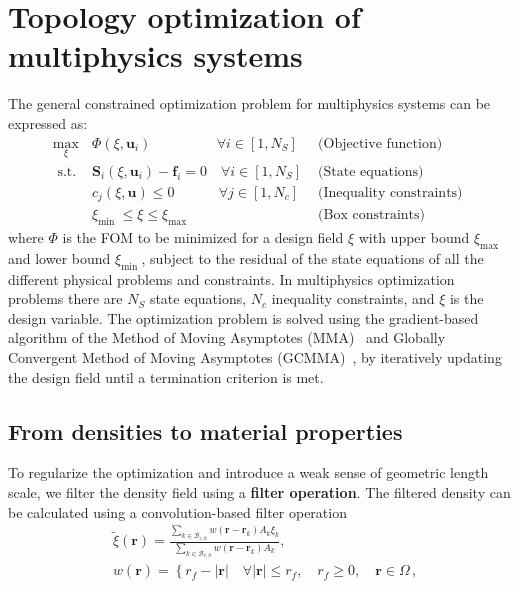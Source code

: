 \section{Topology optimization of multiphysics systems}

The general constrained optimization problem for multiphysics systems can be expressed as:
\begin{equation}
    \begin{array}{clr}
    \max\limits_{\xi} & \Phi(\xi, \mathbf{u}_i) \quad \quad \quad \quad \,\,\,\, \forall i \in\left[1, N_S\right]& \text { (Objective function) } \\
    \text { s.t. } & \mathbf{S}_i(\xi, \mathbf{u}_i)-\mathbf{f}_i=0 \quad \forall i \in\left[1, N_S\right] & \text { (State equations) } \\
    & c_j(\xi, \mathbf{u}) \leq 0 \quad \quad \quad \, \forall j \in\left[1, N_c\right] & \text { (Inequality constraints) } \\
    & \xi_{\text {min }} \leq \xi \leq \xi_{\text {max }} & \text { (Box constraints) }
    \end{array}
\end{equation}
where $\Phi$ is the FOM to be minimized for a design field $\xi$ with upper bound $\xi_{\text {max }}$ and lower bound $\xi_{\text {min }}$,
 subject to the residual of the state equations of all the different physical problems and constraints. In multiphysics optimization problems 
there are $N_S$ state equations, $N_c$ inequality constraints, and $\xi$ is the design variable. The optimization problem is solved using
 the gradient-based algorithm of the Method of Moving
Asymptotes (MMA)~\cite{MMA} and Globally Convergent Method of Moving Asymptotes (GCMMA)~\cite{GCMMA}, by iteratively updating the design field until a termination
criterion is met.

\subsection{From densities to material properties}

To regularize the optimization and introduce a weak sense of geometric length scale, we filter
the density field using a \textbf{filter operation}. The filtered density can be calculated using a 
convolution-based filter operation~\cite{projection}
\begin{equation}
    \begin{aligned}
    & \tilde{\xi}(\mathbf{r})=\frac{\sum_{k \in \mathcal{B}_{e, h}} w\left(\mathbf{r}-\mathbf{r}_k\right) A_k \xi_k}{\sum_{k \in \mathcal{B}_{e, h}} w\left(\mathbf{r}-\mathbf{r}_k\right) A_k}, \\
    & w(\mathbf{r})=\left\{r_f-|\mathbf{r}| \quad \forall|\mathbf{r}| \leq r_f, \quad r_f \geq 0, \quad \mathbf{r} \in \Omega\right.\,,
    \end{aligned}
\end{equation}

